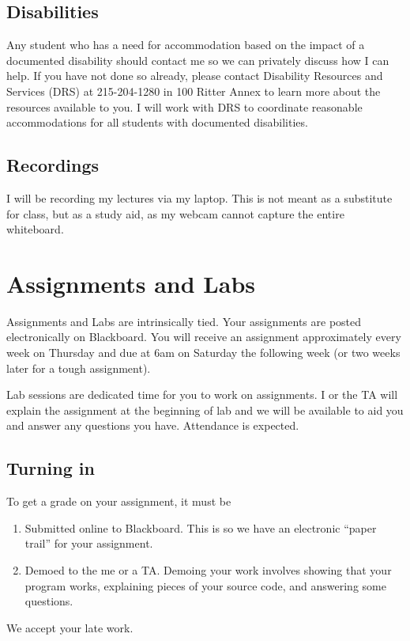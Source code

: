 \documentclass[10pt, letter]{article}
\begin{document}
\subsection*{Disabilities}
Any student who has a need for accommodation based on the impact of a documented disability should contact me so we can privately discuss how I can help. 
If you have not done so already, please contact Disability Resources and Services (DRS) at 215-204-1280 in 100 Ritter Annex to learn more about the resources available to you.
I will work with DRS to coordinate reasonable accommodations for all students with documented disabilities.


\subsection*{Recordings}
I will be recording my lectures via my laptop.
This is not meant as a substitute for class, but as a study aid, as my webcam cannot capture the entire whiteboard.

\section{Assignments and Labs}
Assignments and Labs are intrinsically tied.
Your assignments are posted electronically on Blackboard.
You will receive an assignment approximately every week on Thursday and due at 6am on Saturday the following week (or two weeks later for a tough assignment).

Lab sessions are dedicated time for you to work on assignments.
I or the TA will explain the assignment at the beginning of lab and we will be available to aid you and answer any questions you have.
Attendance is expected.


\subsection*{Turning in}
To get a grade on your assignment, it must be 
\begin{enumerate}
	\item Submitted online to Blackboard.  This is so we have an electronic ``paper trail'' for your assignment.
	\item Demoed to the me or a TA.  Demoing your work involves showing that your program works, explaining pieces of your source code, and answering some questions.
\end{enumerate}

We accept your late work. 
\end{document}
